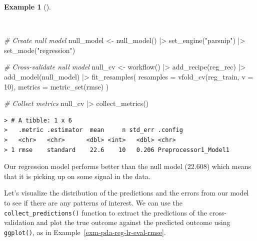 \documentclass[
  letterpaper,
  DIV=11,
  numbers=noendperiod]{scrreprt}
\newenvironment{Shaded}{\begin{snugshade}}{\end{snugshade}}
\newcommand{\AttributeTok}[1]{\textcolor[rgb]{0.00,0.00,0.00}{#1}}
\newcommand{\CommentTok}[1]{\textcolor[rgb]{0.00,0.00,0.00}{\textit{#1}}}
\newcommand{\DecValTok}[1]{\textcolor[rgb]{0.00,0.00,0.00}{#1}}
\newcommand{\FunctionTok}[1]{\textcolor[rgb]{0.00,0.00,0.00}{#1}}
\newcommand{\NormalTok}[1]{\textcolor[rgb]{0.00,0.00,0.00}{#1}}
\newcommand{\OtherTok}[1]{\textcolor[rgb]{0.00,0.00,0.00}{#1}}
\newcommand{\SpecialCharTok}[1]{\textcolor[rgb]{0.00,0.00,0.00}{#1}}
\newcommand{\StringTok}[1]{\textcolor[rgb]{0.00,0.00,0.00}{#1}}
\theoremstyle{definition}
\newtheorem{example}{Example}[chapter]
\theoremstyle{remark}
\begin{document}
\begin{example}[]\protect\hypertarget{exm-pda-reg-model-spec-tune-fit-evaluate-null}{}\label{exm-pda-reg-model-spec-tune-fit-evaluate-null}

~

\begin{Shaded}
\begin{Highlighting}[]
\CommentTok{\# Create null model}
\NormalTok{null\_model }\OtherTok{\textless{}{-}}
  \FunctionTok{null\_model}\NormalTok{() }\SpecialCharTok{|\textgreater{}}
  \FunctionTok{set\_engine}\NormalTok{(}\StringTok{"parsnip"}\NormalTok{) }\SpecialCharTok{|\textgreater{}}
  \FunctionTok{set\_mode}\NormalTok{(}\StringTok{"regression"}\NormalTok{)}

\CommentTok{\# Cross{-}validate null model}
\NormalTok{null\_cv }\OtherTok{\textless{}{-}}
  \FunctionTok{workflow}\NormalTok{() }\SpecialCharTok{|\textgreater{}}
  \FunctionTok{add\_recipe}\NormalTok{(reg\_rec) }\SpecialCharTok{|\textgreater{}}
  \FunctionTok{add\_model}\NormalTok{(null\_model) }\SpecialCharTok{|\textgreater{}}
  \FunctionTok{fit\_resamples}\NormalTok{(}
    \AttributeTok{resamples =} \FunctionTok{vfold\_cv}\NormalTok{(reg\_train, }\AttributeTok{v =} \DecValTok{10}\NormalTok{),}
    \AttributeTok{metrics =} \FunctionTok{metric\_set}\NormalTok{(rmse)}
\NormalTok{  )}

\CommentTok{\# Collect metrics}
\NormalTok{null\_cv }\SpecialCharTok{|\textgreater{}}
  \FunctionTok{collect\_metrics}\NormalTok{()}
\end{Highlighting}
\end{Shaded}

\begin{verbatim}
> # A tibble: 1 x 6
>   .metric .estimator  mean     n std_err .config             
>   <chr>   <chr>      <dbl> <int>   <dbl> <chr>               
> 1 rmse    standard    22.6    10   0.206 Preprocessor1_Model1
\end{verbatim}

\end{example}

Our regression model performs better than the null model (22.608) which
means that it is picking up on some signal in the data.

Let's visualize the distribution of the predictions and the errors from
our model to see if there are any patterns of interest. We can use the
\texttt{collect\_predictions()} function to extract the predictions of
the cross-validation and plot the true outcome against the predicted
outcome using \texttt{ggplot()}, as in
Example~\ref{exm-pda-reg-lr-eval-rmse}.
\end{document}
